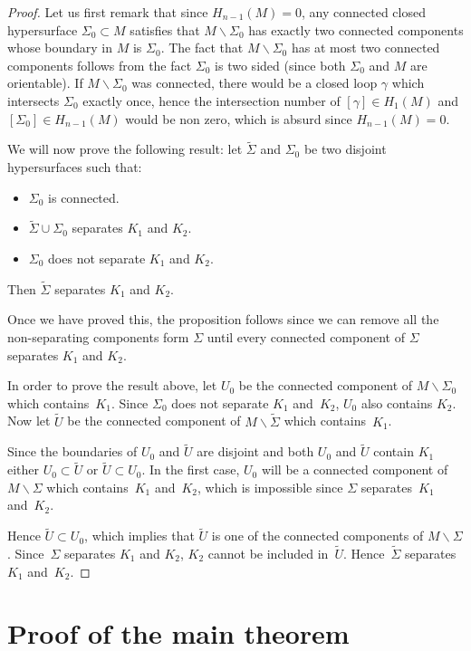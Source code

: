 \documentclass[pdftex]{sigma}
\numberwithin{equation}{section}
\begin{document}
\begin{proof}Let us first remark that since $H_{n-1}(M) = 0$, any connected
 closed hypersurface $\Sigma_0\subset M$ satisfies that
 $M\backslash\Sigma_0$ has exactly two connected components whose
 boundary in $M$ is $\Sigma_0$. The fact that $M\backslash\Sigma_0$ has at most two
 connected components follows from the fact $\Sigma_0$ is two sided
 (since both $\Sigma_0$ and $M$ are orientable). If
 $M\backslash\Sigma_0$ was connected, there would be a closed loop
 $\gamma$ which intersects $\Sigma_0$ exactly once, hence the
 intersection number of $[\gamma]\in H_1(M)$ and $[\Sigma_0]\in
 H_{n-1}(M)$ would be non zero, which is absurd since $H_{n-1}(M)=0$.

 We will now prove the following result: let $\tilde\Sigma$ and $\Sigma_0$ be two disjoint hypersurfaces such
 that:
\begin{itemize}\itemsep=0pt
\item $\Sigma_0$ is connected.
\item $\tilde\Sigma\cup\Sigma_0$ separates $K_1$ and $K_2$.
\item $\Sigma_0$ does not separate $K_1$ and $K_2$.
\end{itemize}
Then $\tilde\Sigma$ separates $K_1$ and $K_2$.

Once we have proved this, the proposition follows since we can remove
all the non-separating components form $\Sigma$ until every connected
component of $\Sigma$ separates $K_1$ and $K_2$.

In order to prove the result above, let $U_0$ be the connected
component of $M\backslash\Sigma_0$ which contains~$K_1$. Since
$\Sigma_0$ does not separate $K_1$ and~$K_2$, $U_0$ also contains
$K_2$. Now let $\tilde U$ be the connected component of
$M\backslash\tilde\Sigma$ which contains~$K_1$.

Since the boundaries of $U_0$ and $\tilde U$ are disjoint and both
$U_0$ and $\tilde U$ contain $K_1$ either
$U_0 \subset \tilde U$ or $\tilde U \subset U_0$. In the first case,
$U_0$ will be a connected component of $M\backslash\Sigma$ which
contains~$K_1$ and~$K_2$, which is impossible since $\Sigma$ separates~$K_1$ and~$K_2$.

Hence $\tilde U \subset U_0$, which implies that $\tilde U$ is one of
the connected components of $M\backslash\Sigma$. Since~$\Sigma$ separates
$K_1$ and $K_2$, $K_2$ cannot be included in~$\tilde U$. Hence~$\tilde\Sigma$ separates
$K_1$ and~$K_2$.
\end{proof}
\section{Proof of the main theorem}
\label{sec:proof}
\end{document}

